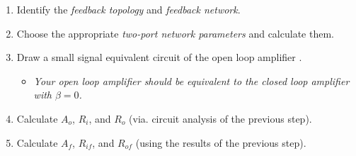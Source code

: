 \begin{CheatsheetEntryFrame}

    \begin{enumerate}
        \item Identify the \emph{feedback topology} and \emph{feedback network}.
        \item Choose the appropriate \emph{two-port network parameters} and calculate them.
        \item Draw a small signal equivalent circuit of the open loop amplifier .
        \begin{itemize}
            \item \emph{Your open loop amplifier should be equivalent to the closed loop amplifier with $\beta = 0$.}
        \end{itemize}
        \item Calculate $A_o$, $R_i$, and $R_o$ {\footnotesize (via. circuit analysis of the previous step)}.
        \item Calculate $A_f$, $R_{if}$, and $R_{of}$ {\footnotesize (using the results of the previous step)}.
    \end{enumerate}

\end{CheatsheetEntryFrame}

